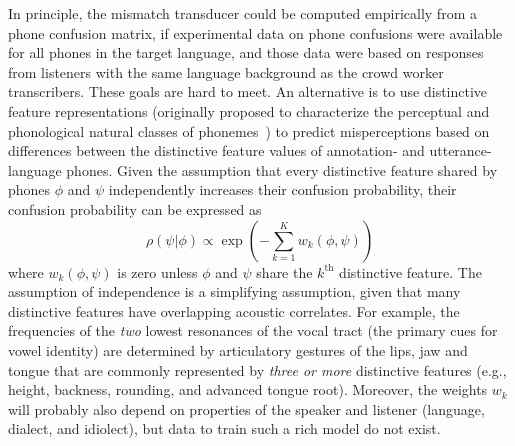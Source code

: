 In principle, the mismatch transducer could be computed empirically from
a phone confusion matrix, if experimental data on phone confusions
were available for all phones in the target language, and those data
were based on responses from listeners with the same language background
as the crowd worker transcribers. These goals are hard to meet. 
An alternative is to use distinctive feature representations
(originally proposed to characterize the perceptual and phonological
natural classes of phonemes~\cite{Jakobson52}) to predict misperceptions
based on differences between the distinctive feature values of 
annotation- and utterance-language phones. Given the assumption that 
every distinctive feature shared by phones $\phi$ and $\psi$ 
independently increases their confusion probability, their confusion 
probability can be expressed as
\begin{equation}
  \rho(\psi|\phi)\propto \exp\left(-\sum_{k=1}^K
  w_k(\phi,\psi)\right)
  \label{eq:dfdist}
\end{equation}
where $w_k(\phi,\psi)$ is
zero unless $\phi$ and $\psi$ share the $k^{\textrm{th}}$ distinctive
feature. The assumption of independence is a simplifying assumption,
given that many distinctive features have overlapping acoustic
correlates. For example, the frequencies of the {\em two} lowest
resonances of the vocal tract (the primary cues for vowel identity) are
determined by articulatory gestures of the lips, jaw and tongue that are
commonly represented by {\em three or more} distinctive features
(e.g., height, backness, rounding, and advanced tongue root). Moreover,
the weights $w_k$ will probably also depend on properties of the speaker
and listener (language, dialect, and idiolect), but data to train such a
rich model do not exist.

